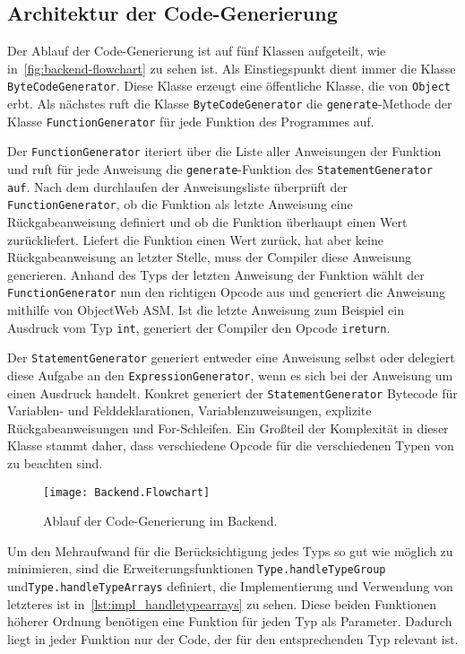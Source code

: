\subsection{Architektur der Code-Generierung}

Der Ablauf der Code-Generierung ist auf fünf Klassen aufgeteilt, wie in~\autoref{fig:backend-flowchart} zu sehen ist. Als Einstiegspunkt dient immer die Klasse \texttt{ByteCodeGenerator}. Diese Klasse erzeugt eine öffentliche Klasse, die von \texttt{Object} erbt. Als nächstes ruft die Klasse \texttt{ByteCodeGenerator} die \texttt{generate}-Methode der Klasse \texttt{FunctionGenerator} für jede Funktion des \toya Programmes auf.

Der \texttt{FunctionGenerator} iteriert über die Liste aller Anweisungen der Funktion und ruft für jede Anweisung die \texttt{generate}-Funktion des \texttt{StatementGenerator auf}. Nach dem durchlaufen der Anweisungsliste überprüft der \texttt{FunctionGenerator}, ob die Funktion als letzte Anweisung eine Rückgabeanweisung definiert und ob die Funktion überhaupt einen Wert zurückliefert. Liefert die Funktion einen Wert zurück, hat aber keine Rückgabeanweisung an letzter Stelle, muss der Compiler diese Anweisung generieren. Anhand des Typs der letzten Anweisung der Funktion wählt der \texttt{FunctionGenerator} nun den richtigen Opcode aus und generiert die Anweisung mithilfe von ObjectWeb ASM. Ist die letzte Anweisung zum Beispiel ein Ausdruck vom Typ \texttt{int}, generiert der \toya Compiler den Opcode \texttt{ireturn}.

Der \texttt{StatementGenerator} generiert entweder eine Anweisung selbst oder delegiert diese Aufgabe an den \texttt{ExpressionGenerator}, wenn es sich bei der Anweisung um einen Ausdruck handelt. Konkret generiert der \texttt{StatementGenerator} Bytecode für Variablen- und Felddeklarationen, Variablenzuweisungen, explizite Rückgabeanweisungen und For-Schleifen. Ein Großteil der Komplexität in dieser Klasse stammt daher, dass verschiedene Opcode für die verschiedenen Typen von \toya zu beachten sind.

\begin{figure}[h]
    \caption{Ablauf der Code-Generierung im Backend.}
    \centering
    \texttt{[image: Backend.Flowchart]}
    \label{fig:backend-flowchart}
\end{figure}

Um den Mehraufwand für die Berücksichtigung jedes Typs so gut wie möglich zu minimieren, sind die Erweiterungsfunktionen \texttt{Type.handleTypeGroup} und\break \texttt{Type.handleTypeArrays} definiert, die Implementierung und Verwendung von letzteres ist in~\autoref{lst:impl_handletypearrays} zu sehen. Diese beiden Funktionen höherer Ordnung benötigen eine Funktion für jeden Typ als Parameter. Dadurch liegt in jeder Funktion nur der Code, der für den entsprechenden Typ relevant ist.

